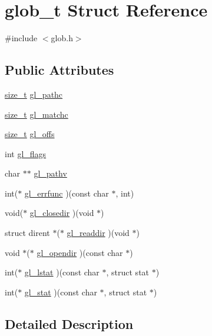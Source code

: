 \hypertarget{structglob__t}{\section{glob\-\_\-t Struct Reference}
\label{structglob__t}
}


{\ttfamily \#include $<$glob.\-h$>$}

\subsection*{Public Attributes}
\begin{DoxyCompactItemize}
\item 
\hyperlink{glob_8h_a0d7e9b0f389ff0e066bbaea2626030f7}{size\-\_\-t} \hyperlink{structglob__t_a69dc492f370a9793f06c11e3eb12f199}{gl\-\_\-pathc}
\item 
\hyperlink{glob_8h_a0d7e9b0f389ff0e066bbaea2626030f7}{size\-\_\-t} \hyperlink{structglob__t_af8d4b3ef84b97cd7779c69f3ef6bc1f2}{gl\-\_\-matchc}
\item 
\hyperlink{glob_8h_a0d7e9b0f389ff0e066bbaea2626030f7}{size\-\_\-t} \hyperlink{structglob__t_ada6945e8f6ca53ecf82c9d736fb5307e}{gl\-\_\-offs}
\item 
int \hyperlink{structglob__t_a1e09b682379e4687de3b58b14ffc2a38}{gl\-\_\-flags}
\item 
char $\ast$$\ast$ \hyperlink{structglob__t_a3265051b3f19f438711c2b7699e475b7}{gl\-\_\-pathv}
\item 
int($\ast$ \hyperlink{structglob__t_a8e8b58f01273eb64976b54273286db5b}{gl\-\_\-errfunc} )(const char $\ast$, int)
\item 
void($\ast$ \hyperlink{structglob__t_a08551e369908622a2901438b76fba875}{gl\-\_\-closedir} )(void $\ast$)
\item 
struct dirent $\ast$($\ast$ \hyperlink{structglob__t_a29f5090e542b832345dd604422d0f719}{gl\-\_\-readdir} )(void $\ast$)
\item 
void $\ast$($\ast$ \hyperlink{structglob__t_aa980e1d696fb49bc71c7e030a646525f}{gl\-\_\-opendir} )(const char $\ast$)
\item 
int($\ast$ \hyperlink{structglob__t_ac6f254caa51d3574cb423ee575b39c07}{gl\-\_\-lstat} )(const char $\ast$, struct stat $\ast$)
\item 
int($\ast$ \hyperlink{structglob__t_a2e616c7c26e469ed25de6ce295f213f2}{gl\-\_\-stat} )(const char $\ast$, struct stat $\ast$)
\end{DoxyCompactItemize}


\subsection{Detailed Description}


